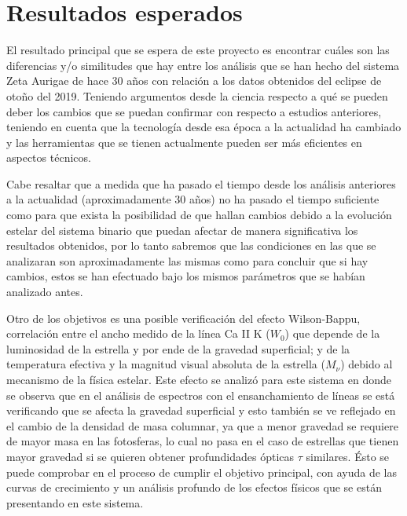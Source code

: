 \documentclass[11pt]{article}
\begin{document}

\section{Resultados esperados}

El resultado principal que se espera de este proyecto es encontrar cuáles son las diferencias y/o similitudes que hay entre los análisis que se han hecho del sistema Zeta Aurigae de hace 30 años con relación a los datos obtenidos del eclipse de otoño del 2019. Teniendo argumentos desde la ciencia respecto a qué se pueden deber los cambios que se puedan confirmar con respecto a estudios anteriores, teniendo en cuenta que la tecnología desde esa época a la actualidad ha cambiado y las herramientas que se tienen actualmente pueden ser más eficientes en aspectos técnicos.

Cabe resaltar que a medida que ha pasado el tiempo desde los análisis anteriores a la actualidad (aproximadamente 30 años) no ha pasado el tiempo suficiente como para que exista la posibilidad de que hallan cambios debido a la evolución estelar del sistema binario que puedan afectar de manera significativa los resultados obtenidos, por lo tanto sabremos que las condiciones en las que se analizaran son aproximadamente las mismas como para concluir que si hay cambios, estos se han efectuado bajo los mismos parámetros que se habían analizado antes.

Otro de los objetivos es una posible verificación del efecto Wilson-Bappu, correlación entre el ancho medido de la línea Ca II K ($W_0$) que depende de la luminosidad de la estrella y por ende de la gravedad superficial; y de la temperatura efectiva y la magnitud visual absoluta de la estrella ($M_{\nu}$) debido al mecanismo de la física estelar. Este efecto se analizó para este sistema en \cite{Dani} donde se observa que en el análisis de espectros con el ensanchamiento de líneas se está verificando que se afecta la gravedad superficial y esto también se ve reflejado en el cambio de la densidad de masa columnar, ya que a menor gravedad se requiere de mayor masa en las fotosferas, lo cual  no pasa en el caso de estrellas que tienen mayor gravedad si se quieren obtener profundidades ópticas $\tau$ similares. Ésto se puede comprobar en el proceso de cumplir el objetivo principal, con ayuda de las curvas de crecimiento y un análisis profundo de los efectos físicos que se están presentando en este sistema.
\end{document}
